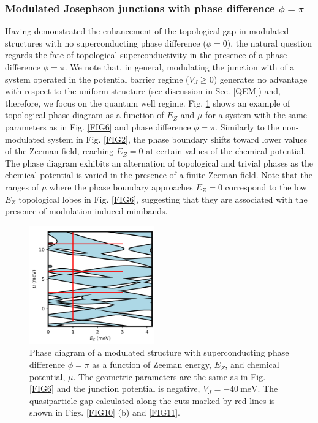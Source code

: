 \documentclass[twocolumn,aps,prb,nofootinbib]{revtex4-2}
\begin{document}
\subsubsection{Modulated Josephson junctions with phase difference $\phi=\pi$} \label{phiPi}

Having demonstrated the enhancement of the topological gap in modulated structures with no superconducting phase difference ($\phi =0$), the natural question regards the fate of topological superconductivity in the presence of a  phase difference $\phi = \pi$. We note that, in general, modulating the junction with of a system operated in the potential barrier regime ($V_J \geq 0$) generates no advantage with respect to the uniform structure (see discussion in Sec. \ref{QEM}) and, therefore, we focus on the quantum well regime.
Fig. \ref{FIG9} shows an example of topological phase diagram as a function of $E_Z$ and $\mu$ for a system with the same parameters as in Fig. \ref{FIG6} and phase difference  $\phi = \pi$. Similarly to the non-modulated system in Fig. \ref{FIG2}, the phase boundary shifts  toward lower values of the Zeeman field, reaching $E_Z = 0$ at certain values of the chemical potential. 
The phase diagram exhibits an alternation of topological and trivial phases as the chemical potential is varied in the presence of a finite Zeeman field. Note that the ranges of $\mu$ where the phase boundary approaches $E_Z = 0$ correspond to the low $E_Z$ topological lobes  in Fig. \ref{FIG6}, suggesting that they are associated with the presence of modulation-induced minibands.

\begin{figure}[t]
\begin{center}
\includegraphics[width=0.48\textwidth]{Fig9.png}
\end{center}
\vspace{-3mm}
\caption{Phase diagram of a modulated structure with superconducting phase difference $\phi=\pi$ as a function of Zeeman energy, $E_Z$, and chemical potential, $\mu$. The geometric parameters are the same as in Fig. \ref{FIG6} and the junction potential is negative, $V_J = -40~\text{meV}$. The quasiparticle gap calculated along the cuts marked by red lines is shown in Figs. \ref{FIG10} (b) and \ref{FIG11}.}
\label{FIG9}
\vspace{-3mm}
\end{figure}
\end{document}
